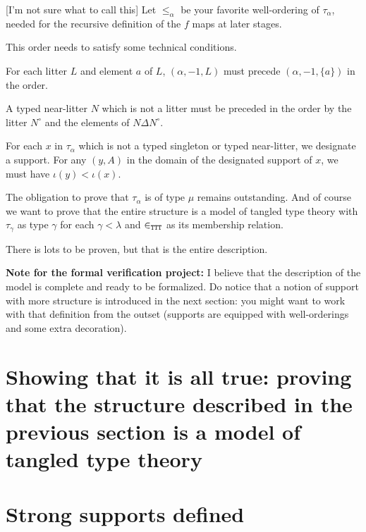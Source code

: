 \begin{definition}
\label {def:word-obligation}
[I'm not sure what to call this]  Let $\leq_\alpha$ be your favorite well-ordering of $\tau_\alpha$, needed for the recursive definition of the $f$ maps at later stages.

This order needs to satisfy some technical conditions.

For each litter $L$ and element $a$ of $L$, $(\alpha,-1,L)$ must precede $(\alpha,-1,\{a\})$ in the order.

A typed near-litter $N$ which is not a litter must be preceded in the order by the litter $N^\circ$ and the elements of
$N \Delta N^\circ$.

For each $x$ in $\tau_\alpha$ which is not a typed singleton or typed near-litter, we designate a support.  For any $(y,A)$ in the domain of the designated support of $x$, we must have $\iota(y)<\iota(x)$.
\end{definition}


The obligation to prove that $\tau_\alpha$ is of type $\mu$ remains outstanding.  And of course we want to prove that the entire structure is a model of tangled type theory with $\tau_\gamma$ as type $\gamma$ for each $\gamma<\lambda$ and $\in_{\tt TTT}$ as its membership relation.

There is lots to be proven, but that is the entire description.


{\bf Note for the formal verification project:}  I believe that the description of the model is complete and ready to be formalized.  Do notice that a notion of support with more structure is introduced in the next section:  you might want to work with that definition from the outset (supports are equipped with well-orderings and some extra decoration).


\newpage

\section{Showing that it is all true:  proving that the structure described in the previous section is a model of tangled type theory}

\section{Strong supports defined}

